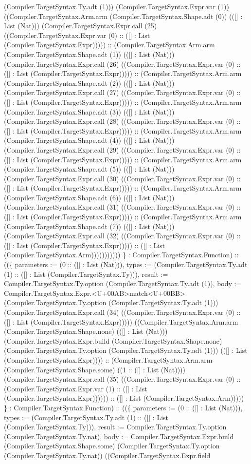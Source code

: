 \documentclass[11pt]{article}
\begin{document}
(Compiler.TargetSyntax.Ty.adt (1))) (Compiler.TargetSyntax.Expr.var (1)) ((Compiler.TargetSyntax.Arm.arm (Compiler.TargetSyntax.Shape.adt (0)) (([] : List (Nat))) (Compiler.TargetSyntax.Expr.call (25) ((Compiler.TargetSyntax.Expr.var (0) :: ([] : List (Compiler.TargetSyntax.Expr))))) :: (Compiler.TargetSyntax.Arm.arm (Compiler.TargetSyntax.Shape.adt (1)) (([] : List (Nat))) (Compiler.TargetSyntax.Expr.call (26) ((Compiler.TargetSyntax.Expr.var (0) :: ([] : List (Compiler.TargetSyntax.Expr))))) :: (Compiler.TargetSyntax.Arm.arm (Compiler.TargetSyntax.Shape.adt (2)) (([] : List (Nat))) (Compiler.TargetSyntax.Expr.call (27) ((Compiler.TargetSyntax.Expr.var (0) :: ([] : List (Compiler.TargetSyntax.Expr))))) :: (Compiler.TargetSyntax.Arm.arm (Compiler.TargetSyntax.Shape.adt (3)) (([] : List (Nat))) (Compiler.TargetSyntax.Expr.call (28) ((Compiler.TargetSyntax.Expr.var (0) :: ([] : List (Compiler.TargetSyntax.Expr))))) :: (Compiler.TargetSyntax.Arm.arm (Compiler.TargetSyntax.Shape.adt (4)) (([] : List (Nat))) (Compiler.TargetSyntax.Expr.call (29) ((Compiler.TargetSyntax.Expr.var (0) :: ([] : List (Compiler.TargetSyntax.Expr))))) :: (Compiler.TargetSyntax.Arm.arm (Compiler.TargetSyntax.Shape.adt (5)) (([] : List (Nat))) (Compiler.TargetSyntax.Expr.call (30) ((Compiler.TargetSyntax.Expr.var (0) :: ([] : List (Compiler.TargetSyntax.Expr))))) :: (Compiler.TargetSyntax.Arm.arm (Compiler.TargetSyntax.Shape.adt (6)) (([] : List (Nat))) (Compiler.TargetSyntax.Expr.call (31) ((Compiler.TargetSyntax.Expr.var (0) :: ([] : List (Compiler.TargetSyntax.Expr))))) :: (Compiler.TargetSyntax.Arm.arm (Compiler.TargetSyntax.Shape.adt (7)) (([] : List (Nat))) (Compiler.TargetSyntax.Expr.call (32) ((Compiler.TargetSyntax.Expr.var (0) :: ([] : List (Compiler.TargetSyntax.Expr))))) :: ([] : List (Compiler.TargetSyntax.Arm))))))))))) \} : Compiler.TargetSyntax.Function) :: ((\{ parameters := (0 :: ([] : List (Nat))), types := (Compiler.TargetSyntax.Ty.adt (1) :: ([] : List (Compiler.TargetSyntax.Ty))), result := Compiler.TargetSyntax.Ty.option (Compiler.TargetSyntax.Ty.adt (1)), body := Compiler.TargetSyntax.Expr.<U+00AB>match<U+00BB> (Compiler.TargetSyntax.Ty.option (Compiler.TargetSyntax.Ty.adt (1))) (Compiler.TargetSyntax.Expr.call (34) ((Compiler.TargetSyntax.Expr.var (0) :: ([] : List (Compiler.TargetSyntax.Expr))))) ((Compiler.TargetSyntax.Arm.arm (Compiler.TargetSyntax.Shape.none) (([] : List (Nat))) (Compiler.TargetSyntax.Expr.build (Compiler.TargetSyntax.Shape.none) (Compiler.TargetSyntax.Ty.option (Compiler.TargetSyntax.Ty.adt (1))) (([] : List (Compiler.TargetSyntax.Expr)))) :: (Compiler.TargetSyntax.Arm.arm (Compiler.TargetSyntax.Shape.some) ((1 :: ([] : List (Nat)))) (Compiler.TargetSyntax.Expr.call (35) ((Compiler.TargetSyntax.Expr.var (0) :: (Compiler.TargetSyntax.Expr.var (1) :: ([] : List (Compiler.TargetSyntax.Expr)))))) :: ([] : List (Compiler.TargetSyntax.Arm))))) \} : Compiler.TargetSyntax.Function) :: ((\{ parameters := (0 :: ([] : List (Nat))), types := (Compiler.TargetSyntax.Ty.adt (1) :: ([] : List (Compiler.TargetSyntax.Ty))), result := Compiler.TargetSyntax.Ty.option (Compiler.TargetSyntax.Ty.nat), body := Compiler.TargetSyntax.Expr.build (Compiler.TargetSyntax.Shape.some) (Compiler.TargetSyntax.Ty.option (Compiler.TargetSyntax.Ty.nat)) ((Compiler.TargetSyntax.Expr.field 
\end{document}
